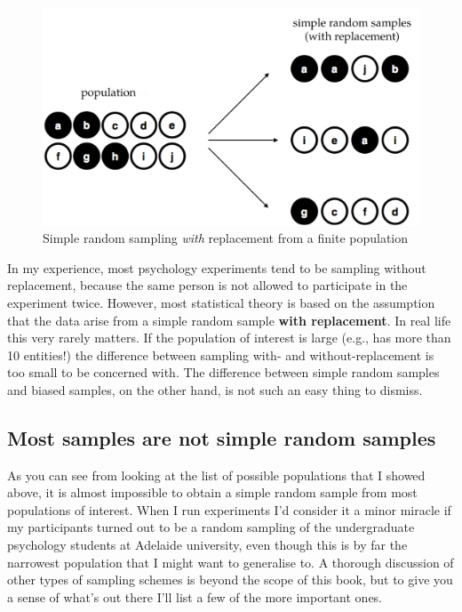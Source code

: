 \documentclass[
  a4paper,
]{book}
\begin{document}
\begin{figure}

\includegraphics[width=1\textwidth,height=\textheight]{images/fig8-3.png} \hfill{}

\caption{\label{fig-fig8-3}Simple random sampling \emph{with}
replacement from a finite population}

\end{figure}

In my experience, most psychology experiments tend to be sampling
without replacement, because the same person is not allowed to
participate in the experiment twice. However, most statistical theory is
based on the assumption that the data arise from a simple random sample
\textbf{with replacement}. In real life this very rarely matters. If the
population of interest is large (e.g., has more than 10 entities!) the
difference between sampling with- and without-replacement is too small
to be concerned with. The difference between simple random samples and
biased samples, on the other hand, is not such an easy thing to dismiss.

\hypertarget{most-samples-are-not-simple-random-samples}{%
\subsection{Most samples are not simple random
samples}\label{most-samples-are-not-simple-random-samples}}

As you can see from looking at the list of possible populations that I
showed above, it is almost impossible to obtain a simple random sample
from most populations of interest. When I run experiments I'd consider
it a minor miracle if my participants turned out to be a random sampling
of the undergraduate psychology students at Adelaide university, even
though this is by far the narrowest population that I might want to
generalise to. A thorough discussion of other types of sampling schemes
is beyond the scope of this book, but to give you a sense of what's out
there I'll list a few of the more important ones.
\end{document}
